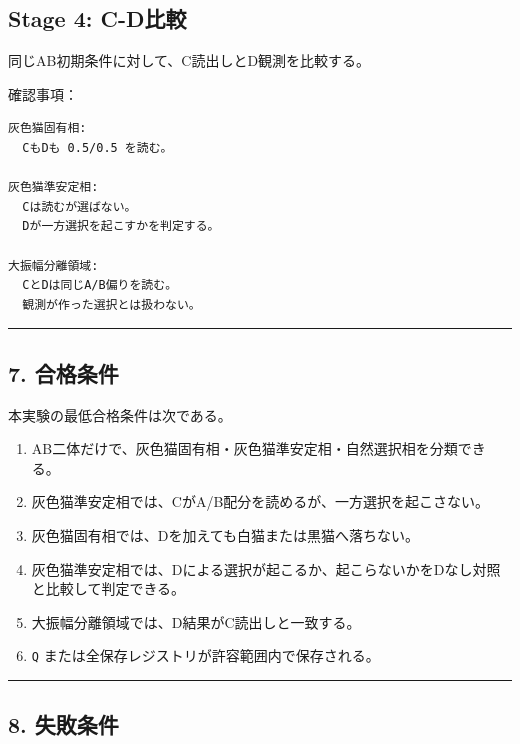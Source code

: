 \documentclass{article}
\providecommand{\tightlist}{\setlength{\itemsep}{0pt}\setlength{\parskip}{0pt}}
\begin{document}
\subsection{Stage 4: C-D比較}\label{stage-4-c-dux6bd4ux8f03}

同じAB初期条件に対して、C読出しとD観測を比較する。

確認事項：

\begin{verbatim}
灰色猫固有相:
  CもDも 0.5/0.5 を読む。

灰色猫準安定相:
  Cは読むが選ばない。
  Dが一方選択を起こすかを判定する。

大振幅分離領域:
  CとDは同じA/B偏りを読む。
  観測が作った選択とは扱わない。
\end{verbatim}

\begin{center}\rule{0.5\linewidth}{0.5pt}\end{center}

\subsection{7. 合格条件}\label{ux5408ux683cux6761ux4ef6}

本実験の最低合格条件は次である。

\begin{enumerate}
\def\labelenumi{\arabic{enumi}.}
\tightlist
\item
  AB二体だけで、灰色猫固有相・灰色猫準安定相・自然選択相を分類できる。
\item
  灰色猫準安定相では、CがA/B配分を読めるが、一方選択を起こさない。
\item
  灰色猫固有相では、Dを加えても白猫または黒猫へ落ちない。
\item
  灰色猫準安定相では、Dによる選択が起こるか、起こらないかをDなし対照と比較して判定できる。
\item
  大振幅分離領域では、D結果がC読出しと一致する。
\item
  \texttt{Q} または全保存レジストリが許容範囲内で保存される。
\end{enumerate}

\begin{center}\rule{0.5\linewidth}{0.5pt}\end{center}

\subsection{8. 失敗条件}\label{ux5931ux6557ux6761ux4ef6}
\end{document}
